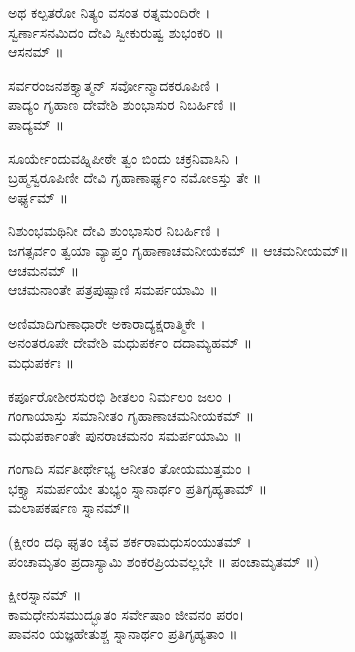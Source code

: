 ಅಥ ಕಲ್ಪತರೋ ನಿತ್ಯಂ ವಸಂತ ರತ್ನಮಂದಿರೇ ।\\
ಸ್ವರ್ಣಾಸನಮಿದಂ ದೇವಿ ಸ್ವೀಕುರುಷ್ವ ಶುಭಂಕರಿ ॥\\
ಆಸನಮ್ ॥

ಸರ್ವರಂಜನಶಕ್ತ್ಯಾತ್ಮನ್ ಸರ್ವೋನ್ಮಾದಕರೂಪಿಣಿ ।\\
ಪಾದ್ಯಂ ಗೃಹಾಣ ದೇವೇಶಿ ಶುಂಭಾಸುರ ನಿಬರ್ಹಿಣಿ ॥\\
ಪಾದ್ಯಮ್ ॥


ಸೂರ್ಯೇಂದುವಹ್ನಿಪೀಠೇ ತ್ವಂ ಬಿಂದು ಚಕ್ರನಿವಾಸಿನಿ ।\\
ಬ್ರಹ್ಮಸ್ವರೂಪಿಣೀ ದೇವಿ ಗೃಹಾಣಾರ್ಘ್ಯಂ ನಮೋಽಸ್ತು ತೇ ॥\\
 ಅರ್ಘ್ಯಮ್ ॥


ನಿಶುಂಭಮಥಿನೀ ದೇವಿ ಶುಂಭಾಸುರ ನಿಬರ್ಹಿಣಿ ।\\
ಜಗತ್ಸರ್ವಂ ತ್ವಯಾ ವ್ಯಾಪ್ತಂ ಗೃಹಾಣಾಚಮನೀಯಕಮ್ ॥ ಆಚಮನೀಯಮ್॥\\
 ಆಚಮನಮ್ ॥\\
ಆಚಮನಾಂತೇ ಪತ್ರಪುಷ್ಪಾಣಿ ಸಮರ್ಪಯಾಮಿ ॥

ಅಣಿಮಾದಿಗುಣಾಧಾರೇ ಅಕಾರಾದ್ಯಕ್ಷರಾತ್ಮಿಕೇ ।\\
ಅನಂತರೂಪೇ ದೇವೇಶಿ ಮಧುಪರ್ಕಂ ದದಾಮ್ಯಹಮ್ ॥\\
 ಮಧುಪರ್ಕಃ ॥

ಕರ್ಪೂರೋಶೀರಸುರಭಿ ಶೀತಲಂ ನಿರ್ಮಲಂ ಜಲಂ ।\\
ಗಂಗಾಯಾಸ್ತು ಸಮಾನೀತಂ ಗೃಹಾಣಾಚಮನೀಯಕಮ್ ॥\\
ಮಧುಪರ್ಕಾಂತೇ ಪುನರಾಚಮನಂ ಸಮರ್ಪಯಾಮಿ ॥

ಗಂಗಾದಿ ಸರ್ವತೀರ್ಥೇಭ್ಯ ಆನೀತಂ ತೋಯಮುತ್ತಮಂ ।\\
ಭಕ್ತ್ಯಾ ಸಮರ್ಪಯೇ ತುಭ್ಯಂ ಸ್ನಾನಾರ್ಥಂ ಪ್ರತಿಗೃಹ್ಯತಾಮ್ ॥\\
ಮಲಾಪಕರ್ಷಣ ಸ್ನಾನಮ್॥

(ಕ್ಷೀರಂ ದಧಿ ಘೃತಂ ಚೈವ ಶರ್ಕರಾಮಧುಸಂಯುತಮ್ ।\\
ಪಂಚಾಮೃತಂ ಪ್ರದಾಸ್ಯಾಮಿ ಶಂಕರಪ್ರಿಯವಲ್ಲಭೇ ॥ ಪಂಚಾಮೃತಮ್ ॥)

ಕ್ಷೀರಸ್ನಾನಮ್ ॥\\
ಕಾಮಧೇನುಸಮುದ್ಭೂತಂ ಸರ್ವೇಷಾಂ ಜೀವನಂ ಪರಂ।\\
ಪಾವನಂ ಯಜ್ಞಹೇತುಶ್ಚ ಸ್ನಾನಾರ್ಥಂ ಪ್ರತಿಗೃಹ್ಯತಾಂ ॥ \\

